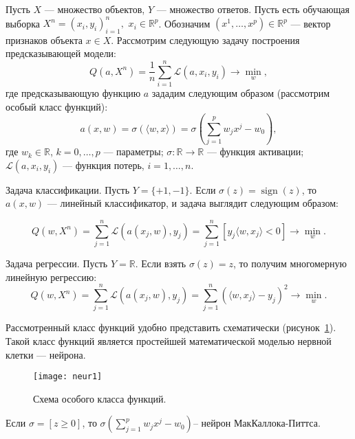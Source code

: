 \documentclass{article}
\DeclareMathOperator{\sign}{sign}
\begin{document}
	Пусть $X$ --- множество объектов, $Y$ --- множество ответов. Пусть есть обучающая выборка $X^n = (x_i, y_i)_{i=1}^{n},$ $x_i \in \mathbb{R}^p$. Обозначим $(x^1,\ldots,x^p)\in \mathbb{R}^p$ --- вектор признаков объекта $x\in X$. Рассмотрим следующую задачу построения предсказывающей модели:
	\begin{equation*}
		Q(a, X^n) = \frac{1}{n} \sum_{i=1}^{n} \mathcal{L}(a,x_i,y_i) \rightarrow \min_w,
	\end{equation*}
	где предсказывающую функцию $a$ зададим следующим образом (рассмотрим особый класс функций):
	\begin{equation*}
		a(x, w) = \sigma( \langle w,x \rangle ) = \sigma\left(\sum_{j=1}^{p} w_j x^j - w_0 \right),
	\end{equation*}
	где $w_k \in \mathbb{R}$, $k=0,\ldots,p$ --- параметры; 
	$\sigma: \mathbb{R} \rightarrow  \mathbb{R} $ --- функция активации;
	$\mathcal{L}(a,x_i,y_i)$ --- функция потерь, $i=1,\ldots,n$.
	
	Задача классификации. Пусть $Y=\{+1,-1\}$. Если $\sigma (z)=\sign (z)$, то $a(x,w)$ --- линейный классификатор, и задача выглядит следующим образом: 
	
	\begin{equation*}
		Q(w, X^{n})=\sum_{j=1}^{n} \mathcal{L} \left( a(x_j ,w), y_j \right) = \sum_{j=1}^{n} [y_j \langle w,x_j \rangle  < 0] \rightarrow \min_{w}.
	\end{equation*}
	
	Задача регрессии. Пусть $Y=\mathbb{R}$. Если взять $\sigma(z)=z$, то получим многомерную линейную регрессию:
	\begin{equation*}
		Q(w, X^{n})=\sum_{j=1}^{n} \mathcal{L} \left( a( x_j,w ), y_j \right)=\sum_{j=1}^{n}\left( \langle w,x_j \rangle  -y_j \right)^2 \rightarrow \min_{w}.
	\end{equation*}
	
	Рассмотренный класс функций удобно представить схематически (рисунок~\ref{neur1}). Такой класс функций является простейшей математической моделью нервной клетки --- нейрона.
	
	\begin{figure}[H]
		\begin{center}
			\texttt{[image: neur1]}
			\caption{Схема особого класса функций.} 
			\label{neur1}
		\end{center}
	\end{figure}
	
	Если $\sigma = [z\geq0]$, то $\sigma\left(\sum_{j=1}^{p} w_j x^j - w_0 \right)$-- нейрон МакКаллока-Питтса. 
	
\end{document}
